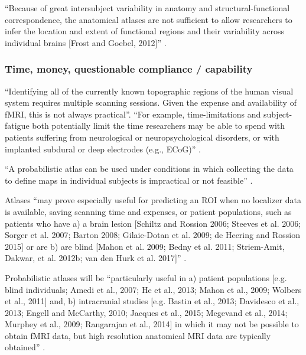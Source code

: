 



``Because of great intersubject variability in anatomy and structural-functional
correspondence, the anatomical atlases are not sufficient to allow researchers
to infer the location and extent of functional regions and their variability
across individual brains [Frost and Goebel, 2012]'' \citep{zhen2015quantifying}.


\subsubsection{Time, money, questionable compliance / capability}

``Identifying all of the currently known topographic regions of the human visual
system requires multiple scanning sessions.
%
Given the expense and availability of fMRI, this is not always practical''.
%
``For example, time-limitations and subject-fatigue both potentially limit the
time researchers may be able to spend with patients suffering from neurological
or neuropsychological disorders, or with implanted subdural or deep electrodes
(e.g., ECoG)'' \citep{wang2015probabilistic}.

%
``A probabilistic atlas can be used under conditions in which collecting the
data to define maps in individual subjects is impractical or not feasible''
\citep{wang2015probabilistic}.


%
Atlases ``may prove especially useful for predicting an ROI when no localizer
data is available, saving scanning time and expenses, or
%
patient populations, such as patients who have
%
a) a brain lesion [Schiltz and Rossion 2006; Steeves et al. 2006; Sorger et al.
2007; Barton 2008; Gilaie-Dotan et al. 2009; de Heering and Rossion 2015] or are
%
b) are blind [Mahon et al. 2009; Bedny et al. 2011; Striem-Amit, Dakwar, et al.
2012b; van den Hurk et al. 2017]'' \citep{rosenke2021probabilistic}.

Probabilistic atlases will be ``particularly useful in
%
a) patient populations [e.g.  blind individuals; Amedi et al., 2007; He et al.,
2013; Mahon et al., 2009; Wolbers et al., 2011] and,
%
b) intracranial studies [e.g. Bastin et al., 2013; Davidesco et al., 2013;
Engell and McCarthy, 2010; Jacques et al., 2015; Megevand et al., 2014; Murphey
et al., 2009; Rangarajan et al., 2014] in which it may not be possible to obtain
fMRI data, but high resolution anatomical MRI data are typically obtained''
\citep{weiner2018defining}.





